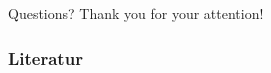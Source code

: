 \begin{frame}{Questions?}
  \centering Thank you for your attention!
\end{frame}

\begin{frame}[allowframebreaks]
  \frametitle{Literatur}
  \printbibliography[heading=none]
\end{frame}